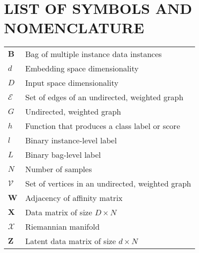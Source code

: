 

\chapter*{LIST OF SYMBOLS AND NOMENCLATURE}  %
\singlespacing
\begin{longtable}{l p{5in}} %

$\bm{B}$ & Bag of  multiple instance data instances \\
$d$ & Embedding space dimensionality\\
$D$ & Input space dimensionality\\
$\mathcal{E}$ & Set of edges of an undirected, weighted graph\\
$G$ & Undirected, weighted graph\\ 
$h$ & Function that produces a class label or score\\
$l$ & Binary instance-level label\\
$L$ & Binary bag-level label \\
$N$ & Number of samples\\
$\mathcal{V}$ & Set of vertices in an undirected, weighted graph\\ 
$\bm{W}$ & Adjacency of affinity matrix\\
$\bm{X}$ & Data matrix of size $D \times N$\\
$\mathcal{X}$ & Riemannian manifold\\
$\bm{Z}$ & Latent data matrix of size $d \times N$\\

\end{longtable}


\doublespacing

